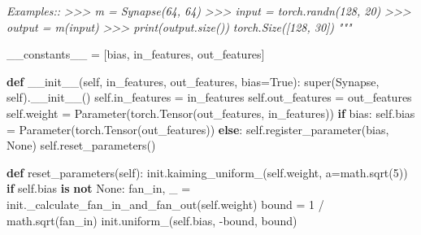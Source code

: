 \documentclass[
]{article}
\newenvironment{Shaded}{}{}
\newcommand{\BuiltInTok}[1]{#1}
\newcommand{\CommentTok}[1]{\textcolor[rgb]{0.38,0.63,0.69}{\textit{#1}}}
\newcommand{\ControlFlowTok}[1]{\textcolor[rgb]{0.00,0.44,0.13}{\textbf{#1}}}
\newcommand{\DecValTok}[1]{\textcolor[rgb]{0.25,0.63,0.44}{#1}}
\newcommand{\FunctionTok}[1]{\textcolor[rgb]{0.02,0.16,0.49}{#1}}
\newcommand{\KeywordTok}[1]{\textcolor[rgb]{0.00,0.44,0.13}{\textbf{#1}}}
\newcommand{\NormalTok}[1]{#1}
\newcommand{\OperatorTok}[1]{\textcolor[rgb]{0.40,0.40,0.40}{#1}}
\newcommand{\StringTok}[1]{\textcolor[rgb]{0.25,0.44,0.63}{#1}}
\newcommand{\VariableTok}[1]{\textcolor[rgb]{0.10,0.09,0.49}{#1}}
\begin{document}
\begin{Shaded}
\begin{Highlighting}[]
\CommentTok{    Examples::}
\CommentTok{        \textgreater{}\textgreater{}\textgreater{} m = Synapse(64, 64)}
\CommentTok{        \textgreater{}\textgreater{}\textgreater{} input = torch.randn(128, 20)}
\CommentTok{        \textgreater{}\textgreater{}\textgreater{} output = m(input)}
\CommentTok{        \textgreater{}\textgreater{}\textgreater{} print(output.size())}
\CommentTok{        torch.Size([128, 30])}
\CommentTok{    """}
\end{Highlighting}
\end{Shaded}

\begin{Shaded}
\begin{Highlighting}[]
\NormalTok{    \_\_constants\_\_ }\OperatorTok{=}\NormalTok{ [}\StringTok{\textquotesingle{}bias\textquotesingle{}}\NormalTok{, }\StringTok{\textquotesingle{}in\_features\textquotesingle{}}\NormalTok{, }\StringTok{\textquotesingle{}out\_features\textquotesingle{}}\NormalTok{]}

    \KeywordTok{def} \FunctionTok{\_\_init\_\_}\NormalTok{(}\VariableTok{self}\NormalTok{, in\_features, out\_features, bias}\OperatorTok{=}\VariableTok{True}\NormalTok{):}
        \BuiltInTok{super}\NormalTok{(Synapse, }\VariableTok{self}\NormalTok{).}\FunctionTok{\_\_init\_\_}\NormalTok{()}
        \VariableTok{self}\NormalTok{.in\_features }\OperatorTok{=}\NormalTok{ in\_features}
        \VariableTok{self}\NormalTok{.out\_features }\OperatorTok{=}\NormalTok{ out\_features}
        \VariableTok{self}\NormalTok{.weight }\OperatorTok{=}\NormalTok{ Parameter(torch.Tensor(out\_features, in\_features))}
        \ControlFlowTok{if}\NormalTok{ bias:}
            \VariableTok{self}\NormalTok{.bias }\OperatorTok{=}\NormalTok{ Parameter(torch.Tensor(out\_features))}
        \ControlFlowTok{else}\NormalTok{:}
            \VariableTok{self}\NormalTok{.register\_parameter(}\StringTok{\textquotesingle{}bias\textquotesingle{}}\NormalTok{, }\VariableTok{None}\NormalTok{)}
        \VariableTok{self}\NormalTok{.reset\_parameters()}
\end{Highlighting}
\end{Shaded}

\begin{Shaded}
\begin{Highlighting}[]
    \KeywordTok{def}\NormalTok{ reset\_parameters(}\VariableTok{self}\NormalTok{):}
\NormalTok{        init.kaiming\_uniform\_(}\VariableTok{self}\NormalTok{.weight, a}\OperatorTok{=}\NormalTok{math.sqrt(}\DecValTok{5}\NormalTok{))}
        \ControlFlowTok{if} \VariableTok{self}\NormalTok{.bias }\KeywordTok{is} \KeywordTok{not} \VariableTok{None}\NormalTok{:}
\NormalTok{            fan\_in, \_ }\OperatorTok{=}\NormalTok{ init.\_calculate\_fan\_in\_and\_fan\_out(}\VariableTok{self}\NormalTok{.weight)}
\NormalTok{            bound }\OperatorTok{=} \DecValTok{1} \OperatorTok{/}\NormalTok{ math.sqrt(fan\_in)}
\NormalTok{            init.uniform\_(}\VariableTok{self}\NormalTok{.bias, }\OperatorTok{{-}}\NormalTok{bound, bound)}
\end{Highlighting}
\end{Shaded}
\end{document}
